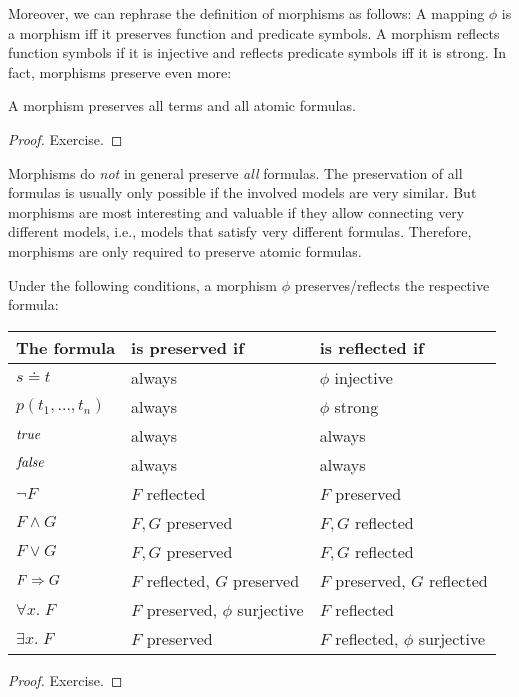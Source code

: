 Moreover, we can rephrase the definition of morphisms as follows: A mapping $\phi$ is a morphism iff it preserves function and predicate symbols.
A morphism reflects function symbols if it is injective and reflects predicate symbols iff it is strong.
In fact, morphisms preserve even more:

\begin{theorem}[Preservation]
A morphism preserves all terms and all atomic formulas.
\end{theorem}
\begin{proof}
Exercise.
\end{proof}

Morphisms do \emph{not} in general preserve \emph{all} formulas.
The preservation of all formulas is usually only possible if the involved models are very similar.
But morphisms are most interesting and valuable if they allow connecting very different models, i.e., models that satisfy very different formulas.
Therefore, morphisms are only required to preserve atomic formulas.

\begin{theorem}\label{thm:univ:preserve}
Under the following conditions, a morphism $\phi$ preserves/reflects the respective formula:
\begin{center}
\begin{tabular}{|l|l|l|}
\hline
The formula & is preserved if & is reflected if \\
\hline
$s\doteq t$ & always & $\phi$ injective \\
$p(t_1,\ldots,t_n)$ & always & $\phi$ strong \\
$\mathit{true}$     & always & always \\
$\mathit{false}$    & always & always \\
$\neg F$    & $F$ reflected & $F$ preserved \\
$F\wedge G$ & $F,G$ preserved & $F,G$ reflected \\
$F\vee G$   & $F,G$ preserved & $F,G$ reflected \\
$F\Rightarrow G$  & $F$ reflected, $G$ preserved & $F$ preserved, $G$ reflected\\
$\forall x.\;F$ & $F$ preserved, $\phi$ surjective & $F$ reflected \\
$\exists x.\;F$ & $F$ preserved & $F$ reflected, $\phi$ surjective \\
\hline
\end{tabular}
\end{center}
\end{theorem}
\begin{proof}
Exercise.
\end{proof}

